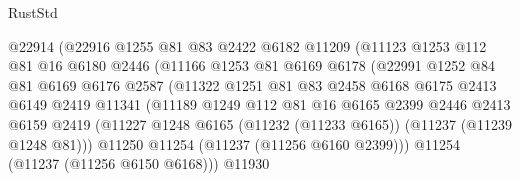 \begin{lexlean}{RustStd}
\begin{coremodule}
                            @22914
                            (@22916
                              @1255
                              @81
                              @83
                              @2422
                              @6182
                              @11209
                              (@11123
                                @1253
                                @112
                                @81
                                @16
                                @6180
                                @2446
                                (@11166
                                  @1253
                                  @81
                                  @6169
                                  @6178
                                  (@22991
                                    @1252
                                    @84
                                    @81
                                    @6169
                                    @6176
                                    @2587
                                    (@11322
                                      @1251
                                      @81
                                      @83
                                      @2458
                                      @6168
                                      @6175
                                      @2413
                                      @6149
                                      @2419
                                      @11341
                                      (@11189
                                        @1249
                                        @112
                                        @81
                                        @16
                                        @6165
                                        @2399
                                        @2446
                                        @2413
                                        @6159
                                        @2419
                                        (@11227
                                          @1248
                                          @6165
                                          (@11232 (@11233 @6165))
                                          (@11237 (@11239 @1248 @81)))
                                        @11250
                                        @11254
                                        (@11237 (@11256 @6160 @2399)))
                                      @11254
                                      (@11237 (@11256 @6150 @6168)))
                                    @11930

\end{coremodule}
\end{lexlean}
